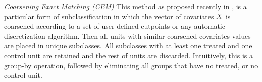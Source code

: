 
{\it Coarsening Exact Matching (CEM)} This method as proposed
recently in \cite{IacKinPor09},  is a particular form of subclassification in which the vector of covariates ${{X}}$ is
coarsened according to a set of user-defined cutpoints or any
automatic discretization algorithm.  Then all units with similar
coarsened covariates values are placed in unique subclasses. All
subclasses with at least one treated and one control unit are retained
and the rest of units are discarded.  Intuitively, this is a group-by
operation, followed by eliminating all groups that have no treated, or
no control unit. 







